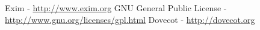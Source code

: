 \begin{thebibliography}{9}
    Exim - \url{http://www.exim.org}
    GNU General Public License - \url{http://www.gnu.org/licenses/gpl.html}
    Dovecot - \url{http://dovecot.org}
\end{thebibliography}



